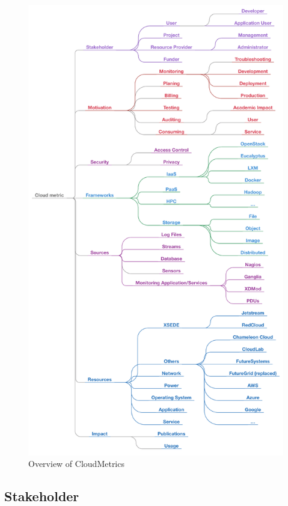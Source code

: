 \documentclass{sig-alternate-05-2015}
\begin{document}
\begin{figure}[h!] 
  \centering 
    \includegraphics[width=1.0\columnwidth]{images/cloudmetric.pdf} 
  \caption{Overview of CloudMetrics}\label{F:taxonomy-1} 
\end{figure} 

\subsection{Stakeholder}
\end{document}
